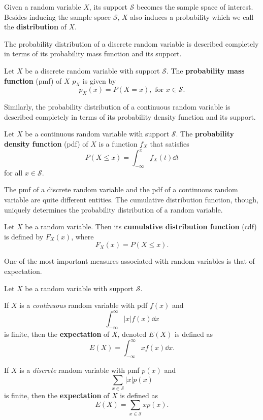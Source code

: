 Given a random variable $X$, its support $\mathcal S$ becomes the sample space of interest. Besides inducing the sample space $\mathcal S$, $X$ also induces a probability which we call the \textbf{distribution} of $X$.

The probability distribution of a discrete random variable is described completely in terms of its probability mass function and its support.

\begin{definition}[pmf]
	Let $X$ be a discrete random variable with support $\mathcal S$. The \textbf{probability mass function} (pmf) of $X$ $p_X$ is given by
$$p_X(x) = P(X = x),\text{ for }x \in \mathcal S.$$
\end{definition}

Similarly, the probability distribution of a continuous random variable is described completely in terms of its probability density function and its support.

\begin{definition}[pdf]
	Let $X$ be a continuous random variable with support $\mathcal S$. The \textbf{probability density function} (pdf) of $X$ is a function $f_X$ that satisfies
$$P(X\leq x)=\int_{-\infty}^xf_X(t)\dd t$$
for all $x\in\mathcal S$.
\end{definition}

The pmf of a discrete random variable and the pdf of a continuous random variable are quite different entities. The cumulative distribution function, though, uniquely determines the probability distribution of a random variable.

\begin{definition}[cdf]
	Let $X$ be a random variable. Then its \textbf{cumulative distribution function} (cdf) is defined by $F_X(x)$, where
$$F_X(x)=P(X\leq x).$$
\end{definition}

One of the most important measures associated with random variables is that of expectation.

\begin{definition}[expectation]
	Let $X$ be a random variable with support $\mathcal S$.

	If $X$ is a \textit{continuous} random variable with pdf $f(x)$ and
	$$\int_{-\infty}^{\infty}|x|f(x)\dd x$$
	is finite, then the \textbf{expectation} of $X$, denoted $E(X)$ is defined as
	$$E(X)=\int_{-\infty}^{\infty} xf(x)\dd x.$$ 

	If $X$ is a \textit{discrete} random variable with pmf $p(x)$ and
	$$\sum_{x\in\mathcal S}|x|p(x)$$
	is finite, then the \textbf{expectation} of $X$ is defined as
	$$E(X)=\sum_{x\in\mathcal S}xp(x).$$
\end{definition}

